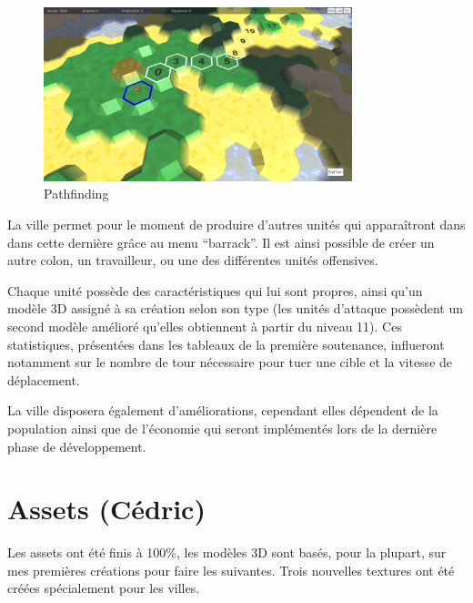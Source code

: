 \documentclass[12pt]{report}
\begin{document}
\begin{figure}[H]
    \centering
    \includegraphics[width=0.8\textwidth]{Pathfinding}
    \caption{Pathfinding}
\end{figure}

La ville permet pour le moment de produire d’autres unités qui apparaîtront dans
dans cette dernière grâce au menu “barrack”. Il est ainsi possible de créer un
autre colon, un travailleur, ou une des différentes unités offensives.

Chaque unité possède des caractéristiques qui lui sont propres, ainsi qu’un
modèle 3D assigné à sa création selon son type (les unités d’attaque possèdent
un second modèle amélioré qu’elles obtiennent à partir du niveau 11). Ces
statistiques, présentées dans les tableaux de la première soutenance, influeront
notamment sur le nombre de tour nécessaire pour tuer une cible et  la vitesse de
déplacement.

La ville disposera également d’améliorations, cependant elles dépendent de la
population ainsi que de l’économie qui seront implémentés lors de la dernière
phase de développement.

\section{Assets (Cédric)}

Les assets ont été finis à 100\%, les modèles 3D sont basés, pour la plupart,
sur mes premières créations pour faire les suivantes. Trois nouvelles textures
ont été créées spécialement pour les villes.
\end{document}
